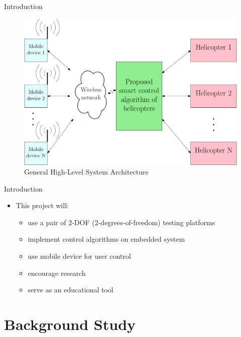 \documentclass{beamer}
\begin{document}
\begin{frame}{Introduction}{} %
\begin{figure}
  \centering
  \includegraphics[scale=0.31]{figs/ipe/highLevel_wht_grn}
  \caption{General High-Level System Architecture}
  \label{fig:highLevel}
\end{figure}
\end{frame}

\begin{frame}{Introduction}{} %
        \begin{itemize}
        \item This project will:
            \begin{itemize}
                \item use a pair of 2-DOF (2-degrees-of-freedom) testing platforms
                \item implement control algorithms on embedded system
                \item use mobile device for user control
                \item encourage research
                \item serve as an educational tool
            \end{itemize}
        \end{itemize}
\end{frame}


\section{Background Study}
\end{document}
